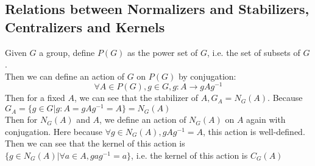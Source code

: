 \documentclass{article}
\begin{document}
\subsection{Relations between Normalizers and Stabilizers, Centralizers and Kernels}
Given $G$ a group, define $P(G)$ as the power set of $G$, i.e. the set of subsets of $G$.\\
Then we can define an action of $G$ on $P(G)$ by conjugation:
\begin{equation*}
    \forall A \in P(G), g \in G, g:A \rightarrow gAg^{-1}
\end{equation*}
Then for a fixed $A$, we can see that the stabilizer of $A, G_A = N_G(A)$. Because $G_A = \{g \in G | g:A = gAg^{-1} = A\} = N_G(A)$\\
Then for $N_G(A)$ and $A$, we define an action of $N_G(A)$ on $A$ again with conjugation. Here because $\forall g \in N_G(A), gAg^{-1} = A$, this action is well-defined.\\
Then we can see that the kernel of this action is $\{g \in N_G(A) | \forall a \in A, gag^{-1} = a\}$, i.e. the kernel of this action is $C_G(A)$
\end{document}
